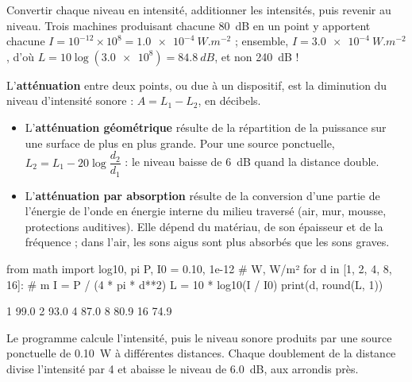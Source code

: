\begin{savoirfaire}
Convertir chaque niveau en intensité, additionner les intensités, puis revenir au niveau. Trois machines produisant
chacune \qty{80}{dB} en un point y apportent chacune $I=10^{-12}\times10^{8}=\qty{1,0e-4}{W.m^{-2}}$ ; ensemble,
$I=\qty{3,0e-4}{W.m^{-2}}$, d'où $L=10\log(\num{3.0e8})=\qty{84,8}{dB}$, et non \qty{240}{dB} !
\end{savoirfaire}
\begin{definition}[Atténuation]
L'\textbf{atténuation} entre deux points, ou due à un dispositif, est la diminution du niveau d'intensité sonore :
$A=L_1-L_2$, en décibels.
\end{definition}
\begin{propriete}
\begin{itemize}
\item L'\textbf{atténuation géométrique} résulte de la répartition de la puissance sur une surface de plus en plus grande.
Pour une source ponctuelle, $L_2=L_1-20\log\dfrac{d_2}{d_1}$ : le niveau baisse de \qty{6}{dB} quand la distance double.
\item L'\textbf{atténuation par absorption} résulte de la conversion d'une partie de l'énergie de l'onde en énergie
interne du milieu traversé (air, mur, mousse, protections auditives). Elle dépend du matériau, de son épaisseur et de
la fréquence ; dans l'air, les sons aigus sont plus absorbés que les sons graves.
\end{itemize}
\end{propriete}
\begin{codecote}[0.58]
\begin{pythoncol}
from math import log10, pi
P, I0 = 0.10, 1e-12            # W, W/m²
for d in [1, 2, 4, 8, 16]:     # m
    I = P / (4 * pi * d**2)
    L = 10 * log10(I / I0)
    print(d, round(L, 1))
\end{pythoncol}
\begin{consolecol}
1 99.0
2 93.0
4 87.0
8 80.9
16 74.9
\end{consolecol}
\cote
\fontsize{9.5}{12.5}\selectfont
{}\par\smallskip
Le programme calcule l'intensité, puis le niveau sonore produits par une source ponctuelle de \qty{0,10}{W} à
différentes distances. Chaque doublement de la distance divise l'intensité par 4 et abaisse le niveau de
\qty{6,0}{dB}, aux arrondis près.
\end{codecote}
